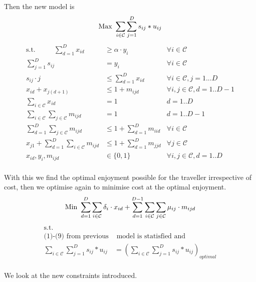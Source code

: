 \documentclass[12pt]{article}
\begin{document}
Then the new model is 
\begin{equation*}
\text{Max } \sum_{i \in \mathcal{C}} \sum_{j=1}^{D} s_{ij} * u_{ij}\\
\end{equation*}
\begin{align}
\text{s.t.~~~~~~~~}
\sum_{d=1}^{D} x_{id} & \geq \alpha \cdot y_{i} & \forall i \in \mathcal{C}\\
\sum_{j=1}^{D} s_{ij} &= y_{i} & \forall i \in \mathcal{C}\\
s_{ij} \cdot j &\leq \sum_{d=1}^{D} x_{id} & \forall i \in \mathcal{C}, j=1...D\\
x_{id} + x_{j(d+1)} & \leq 1 + m_{ijd} & \forall i,j \in \mathcal{C}, d = 1..D-1 \\
\sum_{i \in \mathcal{C}} x_{id} &= 1 & d = 1..D \\
\sum_{i \in \mathcal{C}} \sum_{j \in \mathcal{C}} m_{ijd} &= 1 & d = 1..D-1 \\
\sum_{d=1}^{D} \sum_{j \in \mathcal{C}} m_{ijd} &\leq 1 + \sum_{d=1}^{D} m_{iid} & \forall i \in \mathcal{C} \\
x_{j1} + \sum_{d=1}^{D} \sum_{i \in \mathcal{C}} m_{ijd} &\leq 1 + \sum_{d=1}^{D} m_{jjd} & \forall j \in \mathcal{C}\\
x_{id}, y_{i}, m_{ijd} & \in \{0,1\} & \forall i, j \in \mathcal{C}, d = 1..D
\end{align}\\
With this we find the optimal enjoyment possible for the traveller irrespective of cost, then we optimise again to minimise cost at the optimal enjoyment.
\begin{equation*}
\text{Min } \sum_{d=1}^{D} \sum_{i \in \mathcal{C}} \delta_{i} \cdot x_{id} + \sum_{d=1}^{D-1} \sum_{i \in \mathcal{C}} \sum_{j \in \mathcal{C}} \mu_{ij} \cdot m_{ijd}\\
\end{equation*}
\begin{align*}
\text{s.t.~~~~~~~~} & \\
\text{(1)-(9) from previous} &\text{ model is statisfied and} \\
\sum_{i \in \mathcal{C}} \sum_{j=1}^{D} s_{ij} * u_{ij} &= (\sum_{i \in \mathcal{C}} \sum_{j=1}^{D} s_{ij} * u_{ij})_{optimal}
\end{align*}\\
We look at the new constraints introduced.\\
\vspace{5mm}\\
\end{document}
